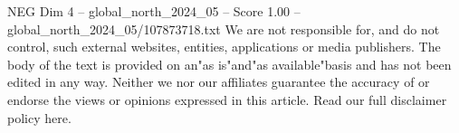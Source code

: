 \begin{textsample}{NEG Dim 4 – global\_north\_2024\_05 – Score 1.00 – global\_north\_2024\_05/107873718.txt}
We are not responsible for, and do not control, such external websites, entities, applications or media publishers.
The body of the text is provided on an"as is"and"as available"basis and has not been edited in any way.
Neither we nor our affiliates guarantee the accuracy of or endorse the views or opinions expressed in this article.
Read our full disclaimer policy here.

\end{textsample}
